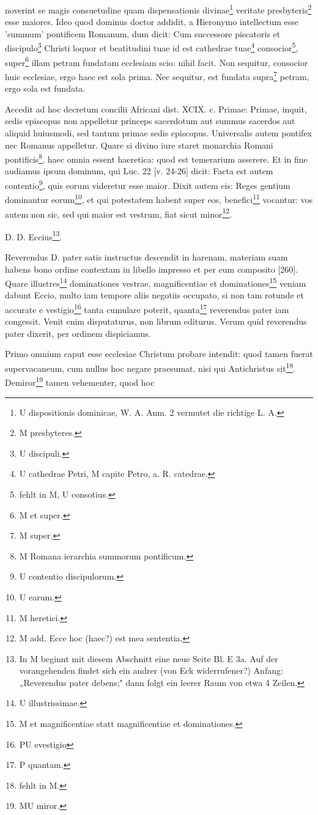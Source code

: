 noverint se magis consuetudine quam dispensationis divinae\footnote{U dispositionis dominicae, W. A. Anm. 2 vermutet die richtige L. A.} veritate presbyteris\footnote{M presbyteres.} esse maiores. Ideo quod dominus doctor addidit, a Hieronymo intellectum esse 'summum' pontificem Romanum, dum dicit: Cum successore piscatoris et discipulo\footnote{U discipuli.} Christi loquor et beatitudini tuae id est cathedrae tuae\footnote{U cathedrae Petri, M capite Petro, a. R. catedrae.} consocior\footnote{fehlt in M, U consotius.}, super\footnote{M et super.} illam petram fundatam ecclesiam scio: nihil facit. Non sequitur, consocior huic ecclesiae, ergo haec est sola prima. Nec sequitur, est fundata supra\footnote{M super.} petram, ergo sola est fundata.

Accedit ad hoc decretum concilii Africani dist. XCIX. c. Primae: Primae, inquit, sedis episcopus non appelletur princeps sacerdotum aut summus sacerdos aut aliquid huiusmodi, sed tantum primae sedis episcopus. Universalis autem pontifex nec Romanus appelletur. Quare si divino iure staret monarchia Romani pontificis\footnote{M Romana ierarchia summorum pontificum.}, haec omnia essent haeretica: quod est temerarium asserere. Et in fine audiamus ipsum dominum, qui Luc. 22 [v. 24-26] dicit: Facta est autem contentio\footnote{U contentio discipulorum.}, quis eorum videretur esse maior. Dixit autem eis: Reges gentium dominantur eorum\footnote{U earum.}, et qui potestatem habent super eos, benefici\footnote{M heretici.} vocantur: vos autem non sic, sed qui maior est vestrum, fiat sicut minor\footnote{M add. Ecce hoc (haec?) est mea sententia.}.

D. D. Eccius\footnote{In M beginnt mit diesem Abschnitt eine neue Seite Bl. E 3a. Auf der vorangehenden findet sich ein andrer (von Eck widerrufener?) Anfang: „Reverendus pater debens;" dann folgt ein leerer Raum von etwa 4 Zeilen.}.

Reverendus D. pater satis instructus descendit in harenam, materiam suam habens bono ordine contextam in libello impresso et per eum composito [260]. Quare illustres\footnote{U illustrissimae.} dominationes vestrae, magnificentiae et dominationes\footnote{M et magnificentiae statt magnificentiae et dominationes.} veniam dabunt Eccio, multo iam tempore aliis negotiis occupato, si non tam rotunde et accurate e vestigio\footnote{PU evestigio} tanta cumulare poterit, quanta\footnote{P quantam.} reverendus pater iam congessit. Venit enim disputaturus, non librum editurus. Verum quid reverendus pater dixerit, per ordinem dispiciamus.

Primo omnium caput esse ecclesiae Christum probare intendit: quod tamen fuerat supervacaneum, cum nullus hoc negare praesumat, nisi qui Antichristus sit\footnote{fehlt in M.}. Demiror\footnote{MU miror.} tamen vehementer, quod hoc
